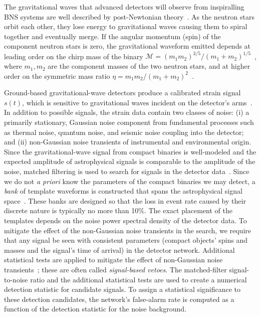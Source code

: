 The gravitational waves that advanced detectors will observe from inspiralling BNS systems
are well described by post-Newtonian theory~\cite{Blanchet:2006zz}.
As the neutron stars orbit each other, they lose energy to gravitational waves
causing them to spiral together and eventually merge.
If the
angular momentum (spin) of the component neutron stars is zero, the gravitational
waveform emitted depends at leading order on the chirp mass of the binary
$\mathcal{M} = \left(m_1 m_2\right)^{3/5}/\left( m_1 +
m_2\right)^{1/5}$~\cite{Peters:1963ux}, where $m_1,m_2$ are the component masses
of the two neutron stars, and at higher order on the symmetric
mass ratio $\eta = m_1 m_2 /
(m_1+m_2)^2$~\cite{Blanchet:1995fg,Blanchet:1995ez,BIWW96,Wi93,BFIJ02,Blanchet:2004ek}.

Ground-based gravitational-wave detectors produce a calibrated strain signal
$s(t)$, which is sensitive to gravitational waves incident on the detector's
arms~\cite{Abadie:2010px}. In addition to possible signals, the strain data contain two classes of
noise: (i) a primarily stationary, Gaussian noise component from fundamental
processes such as thermal noise, quantum noise, and seismic noise coupling
into the detector; and (ii) non-Gaussian noise transients of instrumental and
environmental origin. Since the gravitational-wave signal from compact
binaries is well-modeled and the expected amplitude of astrophysical signals is
comparable to the amplitude of the noise,
matched filtering is used to search for signals in the detector data~\cite{Allen:2005fk}.  Since
we do not \emph{a priori} know the parameters of the compact
binaries we may detect, a \emph{bank} of template waveforms is constructed that spans the astrophysical
signal space~\cite{Sathyaprakash:1991mt,Dhurandhar:1992mw,Owen:1995tm,Owen:1998dk,Babak:2006ty,Cokelaer:2007kx,Brown:2012qf,Keppel:2013yia,Keppel:2013uma}. These banks are designed so that the loss in event rate caused by
their discrete nature is typically no more than 10\%. The exact placement of the
templates depends on the noise power spectral density of the detector data. To
mitigate the effect of the non-Gaussian noise transients in the search, we
require that any signal be seen with consistent parameters (compact objects'
spins and masses and the signal's time of arrival) in the detector network. Additional
statistical tests are applied to mitigate the effect of non-Gaussian
noise transients~\cite{Allen:2004gu}; these are often called \emph{signal-based vetoes}. The 
matched-filter signal-to-noise ratio and the additional statistical tests are used to
create a numerical detection statistic for candidate signals. To assign a
statistical significance to these detection candidates, the network's false-alarm rate is computed as a function of the detection statistic for the
noise background.

